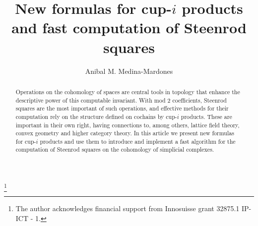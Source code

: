 \documentclass{amsart}
\theoremstyle{definition}
\begin{document}
	
	\title{New formulas for cup-$i$ products and fast computation of Steenrod squares}
	\author{Anibal M. Medina-Mardones}
	\thanks{The author acknowledges financial support from Innosuisse grant 32875.1 IP-ICT - 1.}
	\address{Max Planck Institute for Mathematics in Bonn}
	\address{Department of Mathematics, University of Notre Dame}
	
	\begin{abstract}
		Operations on the cohomology of spaces are central tools in topology that enhance the descriptive power of this computable invariant.
		With mod 2 coefficients, Steenrod squares are the most important of such operations, and effective methods for their computation rely on the structure defined on cochains by cup-$i$ products.
		These are important in their own right, having connections to, among others, lattice field theory, convex geometry and higher category theory.
		In this article we present new formulas for cup-$i$ products and use them to introduce and implement a fast algorithm for the computation of Steenrod squares on the cohomology of simplicial complexes.
	\end{abstract}
	
	\maketitle
	\tableofcontents	
	
	
	
	
	
	
	
	
	
	
	
\end{document}
